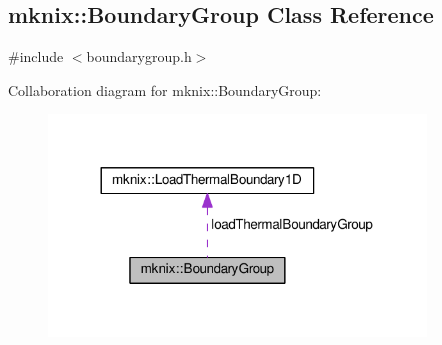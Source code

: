 \hypertarget{classmknix_1_1_boundary_group}{}\subsection{mknix\+:\+:Boundary\+Group Class Reference}
\label{classmknix_1_1_boundary_group}


{\ttfamily \#include $<$boundarygroup.\+h$>$}



Collaboration diagram for mknix\+:\+:Boundary\+Group\+:\nopagebreak
\begin{figure}[H]
\begin{center}
\leavevmode
\includegraphics[width=284pt]{da/d09/classmknix_1_1_boundary_group__coll__graph}
\end{center}
\end{figure}
